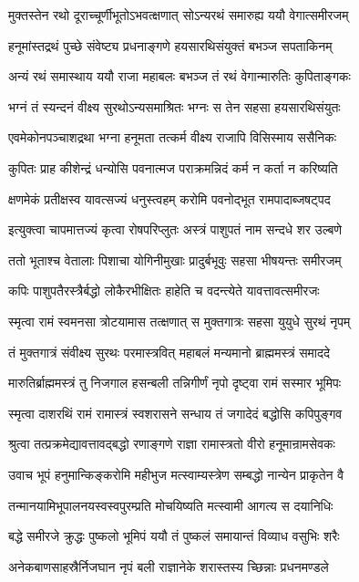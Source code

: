 \twolineshloka
{मुक्तस्तेन रथो दूराच्चूर्णीभूतोऽभवत्क्षणात्}
{सोऽन्यरथं समारुह्य ययौ वेगात्समीरजम्}%

\twolineshloka
{हनूमांस्तद्रथं पुच्छे संवेष्ट्य प्रधनाङ्गणे}
{हयसारथिसंयुक्तं बभञ्ज सपताकिनम्}%

\twolineshloka
{अन्यं रथं समास्थाय ययौ राजा महाबलः}
{बभञ्ज तं रथं वेगान्मारुतिः कुपिताङ्गकः}%

\twolineshloka
{भग्नं तं स्यन्दनं वीक्ष्य सुरथोऽन्यसमाश्रितः}
{भग्नः स तेन सहसा हयसारथिसंयुतः}%

\twolineshloka
{एवमेकोनपञ्चाशद्रथा भग्ना हनूमता}
{तत्कर्म वीक्ष्य राजापि विसिस्माय ससैनिकः}%

\twolineshloka
{कुपितः प्राह कीशेन्द्रं धन्योसि पवनात्मज}
{पराक्रमन्निदं कर्म न कर्ता न करिष्यति}%

\twolineshloka
{क्षणमेकं प्रतीक्षस्व यावत्सज्यं धनुस्त्वहम्}
{करोमि पवनोद्भूत रामपादाब्जषट्पद}%

\twolineshloka
{इत्युक्त्वा चापमात्तज्यं कृत्वा रोषपरिप्लुतः}
{अस्त्रं पाशुपतं नाम सन्दधे शर उल्बणे}%

\twolineshloka
{ततो भूताश्च वेतालाः पिशाचा योगिनीमुखाः}
{प्रादुर्बभूवुः सहसा भीषयन्तः समीरजम्}%

\twolineshloka
{कपिः पाशुपतैरस्त्रैर्बद्धो लोकैरभीक्षितः}
{हाहेति च वदन्त्येते यावत्तावत्समीरजः}%

\twolineshloka
{स्मृत्वा रामं स्वमनसा त्रोटयामास तत्क्षणात्}
{स मुक्तगात्रः सहसा युयुधे सुरथं नृपम्}%

\twolineshloka
{तं मुक्तगात्रं संवीक्ष्य सुरथः परमास्त्रवित्}
{महाबलं मन्यमानो ब्राह्ममस्त्रं समाददे}%

\twolineshloka
{मारुतिर्ब्राह्ममस्त्रं तु निजगाल हसन्बली}
{तन्निगीर्णं नृपो दृष्ट्वा रामं सस्मार भूमिपः}%

\twolineshloka
{स्मृत्वा दाशरथिं रामं रामास्त्रं स्वशरासने}
{सन्धाय तं जगादेदं बद्धोसि कपिपुङ्गव}%

\twolineshloka
{श्रुत्वा तत्प्रक्रमेद्यावत्तावद्बद्धो रणाङ्गणे}
{राज्ञा रामास्त्रतो वीरो हनूमान्रामसेवकः}%

\twolineshloka
{उवाच भूपं हनुमान्किङ्करोमि महीभुज}
{मत्स्वाम्यस्त्रेण सम्बद्धो नान्येन प्राकृतेन वै}%

\twolineshloka
{तन्मानयामिभूपालनयस्वस्वपुरम्प्रति}
{मोचयिष्यति मत्स्वामी आगत्य स दयानिधिः}%

\twolineshloka
{बद्धे समीरजे क्रुद्धः पुष्कलो भूमिपं ययौ}
{तं पुष्कलं समायान्तं विव्याध वसुभिः शरैः}%

\twolineshloka
{अनेकबाणसाहस्रैर्निजघान नृपं बली}
{राज्ञानेके शरास्तस्य च्छिन्नाः प्रधनमण्डले}%

